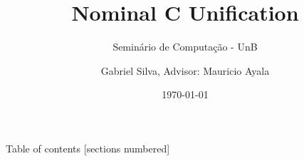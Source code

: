 \documentclass{beamer}
\title{Nominal C Unification}
\subtitle{Seminário de Computação - UnB}
\date{\today}
\author{Gabriel Silva, Advisor: Mauricio Ayala}
\institute{Department of Mathematics - University of Brasília}
\begin{document}
\maketitle

\begin{frame}{Table of contents}
    [sections numbered]
    \tableofcontents
\end{frame}

%
%

%
\end{document}
